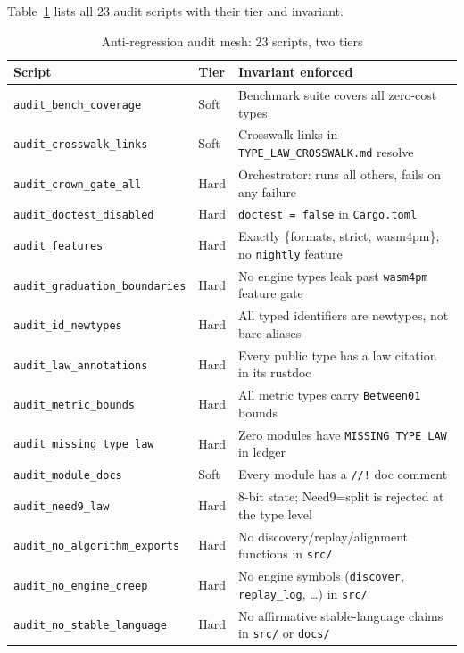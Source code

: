 Table~\ref{tab:audit-scripts} lists all 23 audit scripts with their tier and invariant.

\begin{table}[ht]
\centering
\caption{Anti-regression audit mesh: 23 scripts, two tiers}
\label{tab:audit-scripts}
\begin{tabular}{@{}llp{6cm}@{}}
\toprule
\textbf{Script} & \textbf{Tier} & \textbf{Invariant enforced} \\
\midrule
\texttt{audit\_bench\_coverage}       & Soft & Benchmark suite covers all zero-cost types \\
\texttt{audit\_crosswalk\_links}      & Soft & Crosswalk links in \texttt{TYPE\_LAW\_CROSSWALK.md} resolve \\
\texttt{audit\_crown\_gate\_all}      & Hard & Orchestrator: runs all others, fails on any failure \\
\texttt{audit\_doctest\_disabled}     & Hard & \texttt{doctest = false} in \texttt{Cargo.toml} \\
\texttt{audit\_features}              & Hard & Exactly \{formats, strict, wasm4pm\}; no \texttt{nightly} feature \\
\texttt{audit\_graduation\_boundaries}& Hard & No engine types leak past \texttt{wasm4pm} feature gate \\
\texttt{audit\_id\_newtypes}          & Hard & All typed identifiers are newtypes, not bare aliases \\
\texttt{audit\_law\_annotations}      & Hard & Every public type has a law citation in its rustdoc \\
\texttt{audit\_metric\_bounds}        & Hard & All metric types carry \texttt{Between01} bounds \\
\texttt{audit\_missing\_type\_law}    & Hard & Zero modules have \texttt{MISSING\_TYPE\_LAW} in ledger \\
\texttt{audit\_module\_docs}          & Soft & Every module has a \texttt{//!} doc comment \\
\texttt{audit\_need9\_law}            & Hard & 8-bit state; Need9=split is rejected at the type level \\
\texttt{audit\_no\_algorithm\_exports}& Hard & No discovery/replay/alignment functions in \texttt{src/} \\
\texttt{audit\_no\_engine\_creep}     & Hard & No engine symbols (\texttt{discover}, \texttt{replay\_log}, \ldots) in \texttt{src/} \\
\texttt{audit\_no\_stable\_language}  & Hard & No affirmative stable-language claims in \texttt{src/} or \texttt{docs/} \\

\end{tabular}
\end{table}
